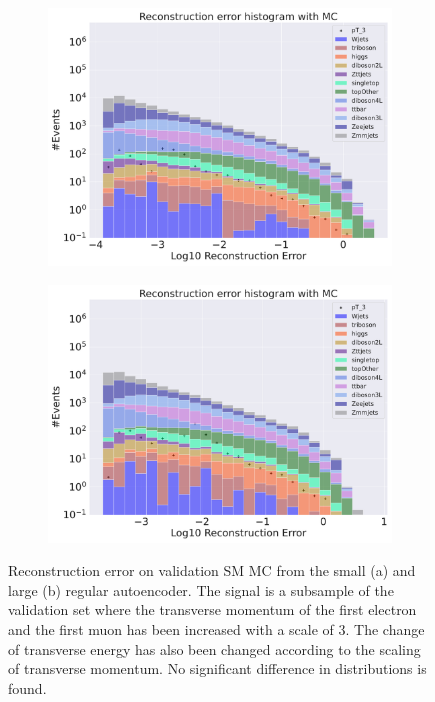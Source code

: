 \begin{figure}[H]
    \centering
    \begin{subfigure}{.45\textwidth}
        \includegraphics[width=\textwidth]{Figures/AE_testing/small/b_data_recon_big_rm3_feats_sig_pT_3.pdf}
        \caption{}
        \label{fig:ae_small_pt_3}
    \end{subfigure}
    \hfill 
    \begin{subfigure}{.45\textwidth}
        \includegraphics[width=\textwidth]{Figures/AE_testing/big/b_data_recon_big_rm3_feats_sig_pT_3.pdf}
        \caption{}
        \label{fig:ae_big_pt_3}
    \end{subfigure}
    \hfill 
    \caption[AE | Reconstruction error $p_T$ altering of 3]{Reconstruction error on validation SM MC from the small (a) and large (b) regular autoencoder. The signal is a subsample of the validation 
    set where the transverse momentum of the first electron and the first muon has been increased with a scale of $3$. The change of transverse 
    energy has also been changed according to the scaling of transverse momentum. No significant difference in distributions is found.  }
    \label{fig:ae_big_small_pt_3}
\end{figure}

